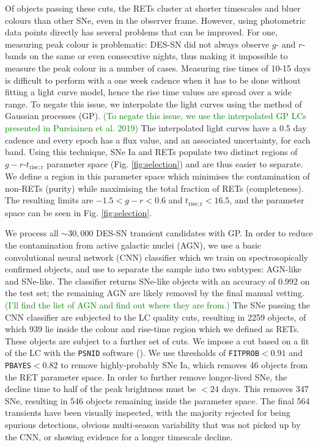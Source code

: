 \documentclass[fleqn,usenatbib,]{mnras}
\begin{document}
Of objects passing these cuts, the RETs cluster at shorter timescales and bluer colours than other SNe, even in the observer frame. However, using photometric data points directly has several problems that can be improved. For one, measuring peak colour is problematic: DES-SN did not always observe $g$- and $r$-bands on the same or even consecutive nights, thus making it impossible to measure the peak colour in a number of cases. Measuring rise times of 10-15 days is difficult to perform with a one week cadence when it has to be done without fitting a light curve model, hence the rise time values are spread over a wide range. To negate this issue, we interpolate the light curves using the method of Gaussian processes (GP). \textcolor{green}{(To negate this issue, we use the interpolated GP LCs presented in Pursiainen et al. 2019)} The interpolated light curves have a 0.5 day cadence and every epoch has a flux value, and an associated uncertainty, for each band. Using this technique, SNe Ia and RETs populate two distinct regions of $g-r$-$t_{\mathrm{rise; r}}$ parameter space (Fig. \ref{fig:selection}) and are thus easier to separate. We define a region in this parameter space which minimises the contamination of non-RETs (purity) while maximising the total fraction of RETs (completeness). The resulting limits are $-1.5 < g-r < 0.6 $ and $t_{\mathrm{rise; r}} <16.5$, and the parameter space can be seen in Fig. \ref{fig:selection}.

We process all $\sim 30,000$ DES-SN transient candidates with GP. In order to reduce the contamination from active galactic nuclei (AGN), we use a basic convolutional neural network (CNN) classifier which we train on spectrosopically confirmed objects, and use to separate the sample into two subtypes: AGN-like and SNe-like. The classifier returns SNe-like objects with an accuracy of 0.992 on the test set; the remaining AGN are likely removed by the final manual vetting. \textcolor{green}{(I'll find the list of AGN and find out where they are from.)}
The SNe passing the CNN classifier are subjected to the LC quality cuts, resulting in 2259 objects, of which 939 lie inside the colour and rise-time region which we defined as RETs. These objects are subject to a further set of cuts. We impose a cut based on a fit of the LC with the \texttt{PSNID} software (\citet{Sako2008}). We use thresholds of \texttt{FITPROB}$<0.91$ and \texttt{PBAYES}$<0.82$ to remove highly-probably SNe Ia, which removes 46 objects from the RET parameter space. In order to further remove longer-lived SNe, the decline time to half of the peak brightness must be $<24$ days. This removes 347 SNe, resulting in 546 objects remaining inside the parameter space. The final 564 transients have been visually inspected, with the majority rejected for being spurious detections, obvious multi-season variability that was not picked up by the CNN, or showing evidence for a longer timescale decline. 
\end{document}
